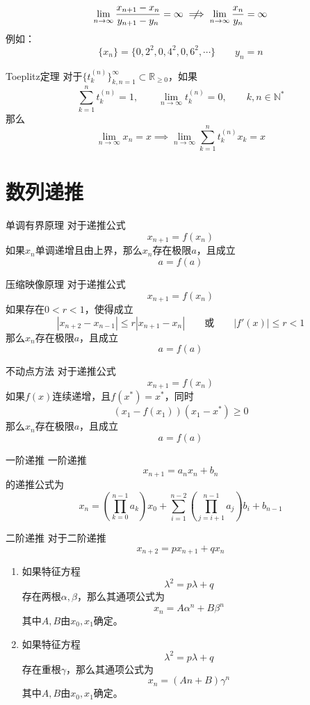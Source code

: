 \documentclass[lang = cn, scheme = chinese, thmcnt = section]{elegantbook}
\newcommand{\N}{\mathbb{N}}            %
\newcommand{\R}{\mathbb{R}}            %
\newcommand{\sub}{\subset}             %
\begin{document}
\begin{note}
	$$
	\lim_{n\to\infty} \frac{x_{n+1}-x_n}{y_{n+1}-y_n}=\infty
	\centernot\implies
	\lim_{n\to\infty}\frac{x_n}{y_n}=\infty
	$$
	例如：
	$$
	\{ x_n \}=\{ 0,2^2,0,4^2,0,6^2,\cdots \}\qquad 
	y_n=n
	$$
\end{note}

\begin{theorem}{Toeplitz定理}
	对于$\{ t_k^{(n)} \}_{k,n=1}^{\infty}\sub\R_{\ge 0}$，如果%
	$$
	\sum_{k=1}^{n}t_k^{(n)}=1,\qquad 
	\lim_{n\to\infty}t_k^{(n)}=0,\qquad 
	k,n\in\N^*
	$$
	那么%
	$$
	\lim_{n\to\infty}x_n=x\implies
	\lim_{n\to\infty}\sum_{k=1}^{n}t_k^{(n)}x_k=x
	$$
\end{theorem}

\section{数列递推}

\begin{theorem}{单调有界原理}
	对于递推公式
	$$
	x_{n+1}=f(x_n)
	$$
	如果$x_n$单调递增且由上界，那么$x_n$存在极限$a$，且成立
	$$
	a=f(a)
	$$
\end{theorem}

\begin{theorem}{压缩映像原理}
	对于递推公式
	$$
	x_{n+1}=f(x_n)
	$$
	如果存在$0<r<1$，使得成立
	$$
	|x_{n+2}-x_{n-1}|\le r|x_{n+1}-x_n|
	\qquad\text{或}\qquad
	|f'(x)|\le r<1
	$$
	那么$x_n$存在极限$a$，且成立
	$$
	a=f(a)
	$$
\end{theorem}

\begin{theorem}{不动点方法}
	对于递推公式
	$$
	x_{n+1}=f(x_n)
	$$
	如果$f(x)$连续递增，且$f(x^*)=x^*$，同时
	$$
	(x_1-f(x_1))(x_1-x^*)\ge 0
	$$
	那么$x_n$存在极限$a$，且成立
	$$
	a=f(a)
	$$
\end{theorem}

\begin{theorem}{一阶递推}
	一阶递推
	$$
	x_{n+1}=a_nx_n+b_n
	$$
	的递推公式为
	$$
	x_n
	=\left(\prod_{k=0}^{n-1}a_k\right)x_0
	+\sum_{i=1}^{n-2}\left(\prod_{j=i+1}^{n-1}a_j\right) b_i
	+b_{n-1}
	$$
\end{theorem}

\begin{theorem}{二阶递推}
	对于二阶递推
	$$
	x_{n+2}=px_{n+1}+qx_n
	$$
	\begin{enumerate}
		\item 如果特征方程
		$$
		\lambda^2=p\lambda+q
		$$
		存在两根$\alpha,\beta$，那么其通项公式为
		$$
		x_n=A\alpha^n+B\beta^n
		$$
		其中$A,B$由$x_0,x_1$确定。
		\item 如果特征方程
		$$
		\lambda^2=p\lambda+q
		$$
		存在重根$\gamma$，那么其通项公式为
		$$
		x_n=(An+B)\gamma^n
		$$
		其中$A,B$由$x_0,x_1$确定。
	\end{enumerate}
\end{theorem}
\end{document}
